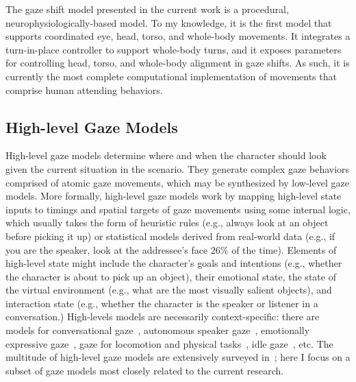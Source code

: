 The gaze shift model presented in the current work is a procedural, neurophysiologically-based model. To my knowledge, it is the first model that supports coordinated eye, head, torso, and whole-body movements. It integrates a turn-in-place controller to support whole-body turns, and it exposes parameters for controlling head, torso, and whole-body alignment in gaze shifts. As such, it is currently the most complete computational implementation of movements that comprise human attending behaviors.

\subsection{High-level Gaze Models}

High-level gaze models determine where and when the character should look given the current situation in the scenario. They generate complex gaze behaviors comprised of atomic gaze movements, which may be synthesized by low-level gaze models. More formally, high-level gaze models work by mapping high-level state inputs to timings and spatial targets of gaze movements using some internal logic, which usually takes the form of heuristic rules (e.g., always look at an object before picking it up) or statistical models derived from real-world data (e.g., if you are the speaker, look at the addressee's face 26\% of the time). Elements of high-level state might include the character's goals and intentions (e.g., whether the character is about to pick up an object), their emotional state, the state of the virtual environment (e.g., what are the most visually salient objects), and interaction state (e.g., whether the character is the speaker or listener in a conversation.) High-levels models are necessarily context-specific: there are models for conversational gaze~\cite{pelachaud2003modelling,masuko2007headeye,gratch2007rapport,andrist2013aversion,lee2007rickel}, autonomous speaker gaze~\cite{bee2010gaze,zoric2011oncreating,marsella2013virtual}, emotionally expressive gaze~\cite{queiroz2007automatic,lance2010expressive,li2012emotional}, gaze for locomotion and physical tasks~\cite{khullar2001look,mitake2007reactive,huang16planning}, idle gaze~\cite{khullar2001look,peters2003bottomup,mitake2007reactive,peters2008applying,cafaro2009animating,grillon2009crowds,kokkinara2011modelling}, etc. The multitude of high-level gaze models are extensively surveyed in~\cite{ruhland2015gazereview}; here I focus on a subset of gaze models most closely related to the current research.


